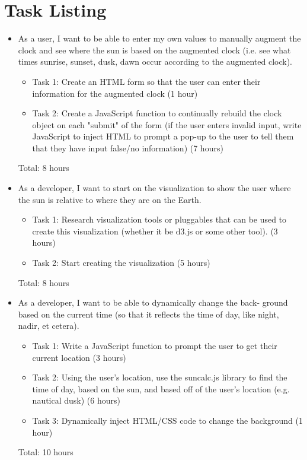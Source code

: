 \documentclass[11pt]{article}
\begin{document}
	\section{Task Listing}
		\vspace{-3mm}
		\begin{itemize}
			\item As a user, I want to be able to enter my own values to manually augment the clock and see where the sun is based on the augmented clock (i.e. see what times sunrise, sunset, dusk, dawn occur according to the augmented clock).
			\begin{itemize}
			    \item Task 1: Create an HTML form so that the user can enter their information for the augmented clock (1 hour)
			    \item Task 2: Create a JavaScript function to continually rebuild the clock object on each "submit" of the form (if the user enters invalid input, write JavaScript to inject HTML to prompt a pop-up to the user to tell them that they have input false/no information) (7 hours)
			\end{itemize}
			Total: 8 hours
			\item As a developer, I want to start on the visualization to show the user where the sun is relative to where they are on the Earth.
			\begin{itemize}
			    \item Task 1: Research visualization tools or pluggables that can be used to create this visualization (whether it be d3.js or some other tool). (3 hours)
			    \item Task 2: Start creating the visualization (5 hours)
			\end{itemize}
			Total: 8 hours
			\item As a developer, I want to be able to dynamically change the back- ground based on the current time (so that it reflects the time of day, like night, nadir, et cetera).
			\begin{itemize}
			    \item Task 1: Write a JavaScript function to prompt the user to get their current location (3 hours)
			    \item Task 2: Using the user's location, use the suncalc.js library to find the time of day, based on the sun, and based off of the user's location (e.g. nautical dusk) (6 hours)
			    \item Task 3: Dynamically inject HTML/CSS code to change the background (1 hour)
			\end{itemize}
			 Total: 10 hours
		\end{itemize}
		
\end{document}
